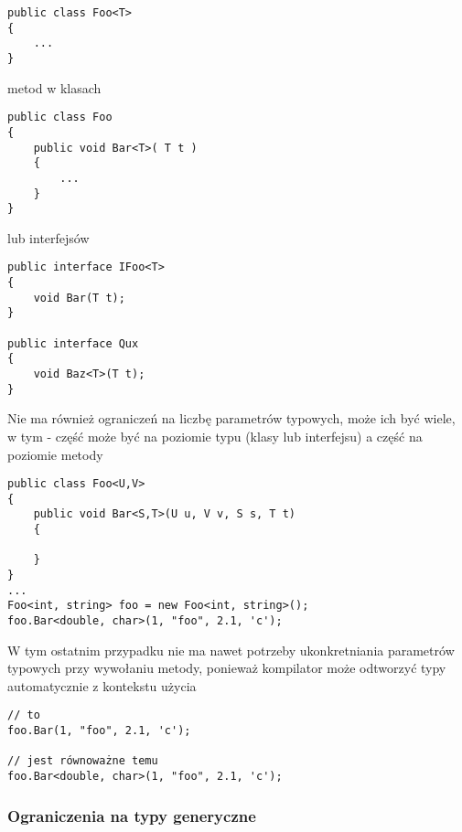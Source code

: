 \begin{scriptsize}
\begin{verbatim}
public class Foo<T>
{
    ...
}
\end{verbatim}
\end{scriptsize}

metod w klasach 

\begin{scriptsize}
\begin{verbatim}
public class Foo
{
    public void Bar<T>( T t )
    {
        ...
    }
}
\end{verbatim}
\end{scriptsize}

lub interfejsów

\begin{scriptsize}
\begin{verbatim}
public interface IFoo<T>
{
    void Bar(T t);
}

public interface Qux
{
    void Baz<T>(T t);
}
\end{verbatim}
\end{scriptsize}

Nie ma również ograniczeń na liczbę parametrów typowych, może ich być wiele, w tym - część może być na poziomie typu
(klasy lub interfejsu) a część na poziomie metody

\begin{scriptsize}
\begin{verbatim}
public class Foo<U,V>
{
    public void Bar<S,T>(U u, V v, S s, T t)
    {

    }
}
...
Foo<int, string> foo = new Foo<int, string>();
foo.Bar<double, char>(1, "foo", 2.1, 'c');
\end{verbatim}
\end{scriptsize}

W tym ostatnim przypadku nie ma nawet potrzeby ukonkretniania parametrów typowych przy wywołaniu metody,
ponieważ kompilator może odtworzyć typy automatycznie z kontekstu użycia

\begin{scriptsize}
\begin{verbatim}
// to
foo.Bar(1, "foo", 2.1, 'c');

// jest równoważne temu
foo.Bar<double, char>(1, "foo", 2.1, 'c');
\end{verbatim}
\end{scriptsize}

\subsubsection{Ograniczenia na typy generyczne}

